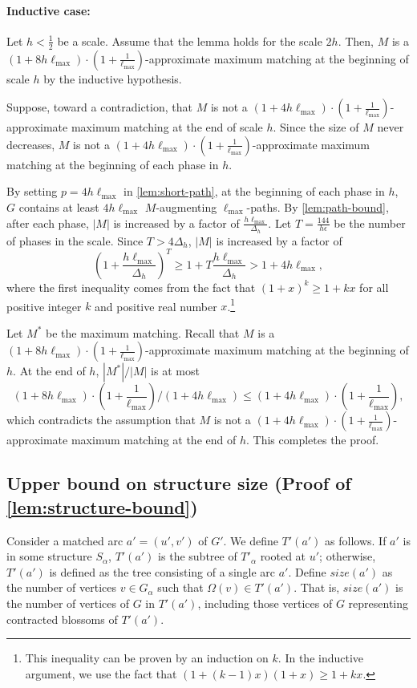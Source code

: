 \documentclass{article}
\newcommand{\alp}{\alpha}
\newcommand{\eps}{\epsilon}
\newcommand{\Omg}{\Omega}
\newcommand{\lmax}{\ell_{\max}}
\newcommand{\rb}[1]{\left( #1 \right)}
\begin{document}
\paragraph{Inductive case:}    
    Let $h < \frac{1}{2}$ be a scale.
    Assume that the lemma holds for the scale $2h$.
    Then, $M$ is a $(1 + 8h\lmax) \cdot \rb{1 + \frac{1}{\lmax}}$-approximate maximum matching at the beginning of scale $h$ by the inductive hypothesis.
    
    Suppose, toward a contradiction, that $M$ is not a $\rb{1 + 4h\lmax} \cdot \rb{1 + \frac{1}{\lmax}}$-approximate maximum matching at the end of scale $h$.
    Since the size of $M$ never decreases, $M$ is not a $\rb{1 + 4h\lmax} \cdot \rb{1 + \frac{1}{\lmax}}$-approximate maximum matching at the beginning of each phase in $h$.
    
    By setting $p = 4h\lmax$ in \cref{lem:short-path}, at the beginning of each phase in $h$, $G$ contains at least $4h\lmax$ $M$-augmenting $\lmax$-paths.
    By \cref{lem:path-bound}, after each phase, $|M|$ is increased by a factor of $\frac{h\lmax}{\Delta_h}$.
    Let $T = \frac{144}{h \eps}$ be the number of phases in the scale.
    Since $T > 4\Delta_h$, $|M|$ is increased by a factor of
    \[
        \rb{1 + \frac{h\lmax}{\Delta_h}}^T
        \geq 1 + T \frac{h\lmax}{\Delta_h}
        > 1 + 4h\lmax,
    \]
    where the first inequality comes from the fact that $(1 + x)^k \geq 1 + kx$ for all positive integer $k$ and positive real number $x$.\footnote{This inequality can be proven by an induction on $k$. In the inductive argument, we use the fact that $(1 + (k-1)x)(1+x) \geq 1 + kx$.}
    
    Let $M^*$ be the maximum matching.
    Recall that $M$ is a $(1 + 8h\lmax)\cdot \rb{1 + \frac{1}{\lmax}}$-approximate maximum matching at the beginning of $h$.
    At the end of $h$, $|M^*| / |M|$ is at most
    \[
        (1 + 8h\lmax)\cdot \rb{1 + \frac{1}{\lmax}} / \rb{1 + 4h\lmax} \leq \rb{1 + 4h\lmax}\cdot \rb{1 + \frac{1}{\lmax}},
    \]
    which contradicts the assumption that $M$ is not a $\rb{1 + 4h\lmax}\cdot \rb{1 + \frac{1}{\lmax}}$-approximate maximum matching at the end of $h$.
    This completes the proof.


\subsection{Upper bound on structure size (Proof of \cref{lem:structure-bound})}
\label{sec:proof-structure-bound}
Consider a matched arc $a' = (u', v')$ of $G'$. We define $T'(a')$ as follows.
If $a'$ is in some structure $S_\alp$, $T'(a')$ is the subtree of $T'_\alp$ rooted at $u'$;
otherwise, $T'(a')$ is defined as the tree consisting of a single arc $a'$.
Define $size(a')$ as the number of vertices $v \in G_\alp$ such that $\Omg(v) \in T'(a')$. That is, $size(a')$ is the number of vertices of $G$ in $T'(a')$, including those vertices of $G$ representing contracted blossoms of $T'(a')$.
\end{document}

